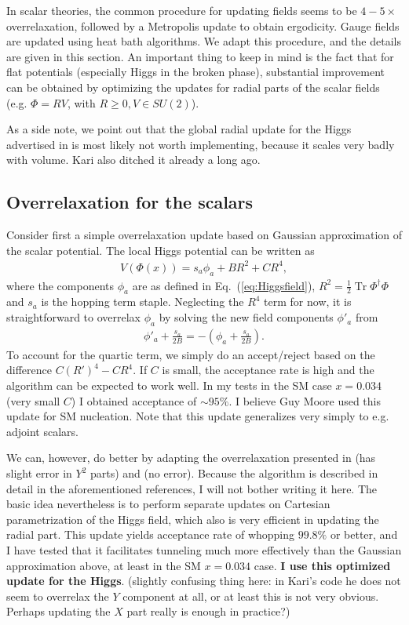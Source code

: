 \documentclass[11pt,a4paper]{article}
\newcommand\Tr{\operatorname{Tr}}
\newcommand\lauri[1]{{\color{myorange}#1}}
\begin{document}
In scalar theories, the common procedure for updating fields seems to be $4-5 \times $overrelaxation, followed by a Metropolis update to obtain ergodicity. Gauge fields are updated using heat bath algorithms. We adapt this procedure, and the details are given in this section. An important thing to keep in mind is the fact that for flat potentials (especially Higgs in the broken phase), substantial improvement can be obtained by optimizing the updates for radial parts of the scalar fields (e.g. $\Phi = R V$, with $R \geq 0, V \in SU(2)$). 

As a side note, we point out that the global radial update for the Higgs advertised in \cite{Kajantie:1995kf} is most likely not worth implementing, because it scales very badly with volume. \lauri{Kari also ditched it already a long ago.}

\subsection{Overrelaxation for the scalars}

Consider first a simple overrelaxation update based on Gaussian approximation of the scalar potential. The local Higgs potential can be written as 
\begin{align}
V(\Phi(x)) = s_a \phi_a + B R^2 + C R^4,
\end{align}
where the components $\phi_a$ are as defined in Eq.~(\ref{eq:Higgsfield}), $R^2 = \frac12 \Tr\Phi^\dagger\Phi$ and $s_a$ is the hopping term staple. Neglecting the $R^4$ term for now, it is straightforward to overrelax $\phi_a$ by solving the new field components $\phi'_a$ from
\begin{align}
\phi'_a + \frac{s_a}{2B} = -(\phi_a + \frac{s_a}{2B}).
\end{align}
To account for the quartic term, we simply do an accept/reject based on the difference $C (R')^4 - C R^4$. If $C$ is small, the acceptance rate is high and the algorithm can be expected to work well. In my tests in the SM case $x=0.034$ (very small $C$) I obtained acceptance of $\sim 95\%$. \lauri{I believe Guy Moore used this update for SM nucleation.} Note that this update generalizes very simply to e.g. adjoint scalars.

We can, however, do better by adapting the overrelaxation presented in \cite{Kajantie:1995kf} (has slight error in $Y^2$ parts) and \cite{Laine:1998qk} (no error). Because the algorithm is described in detail in the aforementioned references, I will not bother writing it here. The basic idea nevertheless is to perform separate updates on Cartesian parametrization of the Higgs field, which also is very efficient in updating the radial part. This update yields acceptance rate of whopping $99.8\%$ or better, and I have tested that it facilitates tunneling much more effectively than the Gaussian approximation above, at least in the SM $x = 0.034$ case. \textbf{I use this optimized update for the Higgs}. \lauri{(slightly confusing thing here: in Kari's code he does not seem to overrelax the $Y$ component at all, or at least this is not very obvious. Perhaps updating the $X$ part really is enough in practice?)}
\end{document}
